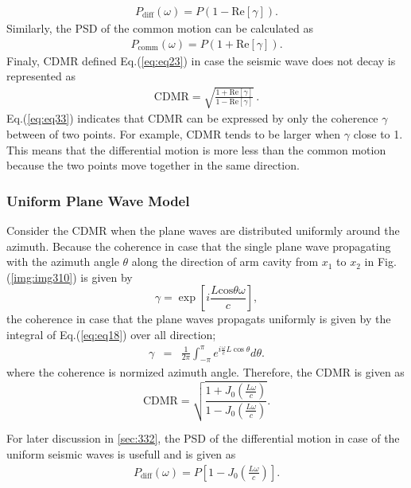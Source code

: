 \begin{eqnarray} \label{eq:eq32}
  P_{\mathrm{diff}}(\omega) = P (1-\mathrm{Re}\left[\gamma\right]).
\end{eqnarray}
Similarly, the PSD of the common motion can be calculated as
\begin{eqnarray}
  P_{\mathrm{comm}}(\omega) = P (1+\mathrm{Re}\left[\gamma\right]).
\end{eqnarray}
Finaly, CDMR defined Eq.(\ref{eq:eq23}) in case the seismic wave does not decay is represented as
\begin{eqnarray}
 \mathrm{CDMR} = \sqrt{\frac{1 + \mathrm{Re} \left[\gamma \right] }{1 - \mathrm{Re} \left[\gamma \right]}}\,. \label{eq:eq33}
\end{eqnarray}
Eq.(\ref{eq:eq33}) indicates that CDMR can be expressed by only the coherence $\gamma$ between of two points. For example, CDMR tends to be larger when $\gamma$ close to 1. This means that the differential motion is more less than the common motion because the two points move together in the same direction.


\subsubsection{Uniform Plane Wave Model}
Consider the CDMR when the plane waves are distributed uniformly around the azimuth. Because the coherence in case that the single plane wave propagating with the azimuth angle $\theta$ along the direction of arm cavity from $x_1$ to $x_2$ in Fig.(\ref{img:img310}) is given by
\begin{equation}
  \gamma = \exp\left[{i\frac{L\mathrm{cos}\theta\omega}{c}}\right], \label{eq:eq18}
\end{equation} 
the coherence in case that the plane waves propagats uniformly is given by the integral of Eq.(\ref{eq:eq18}) over all direction;
\begin{eqnarray} \label{eq:eq19}
  \gamma &=& \frac{1}{2\pi} \int_{-\pi}^{\pi} e^{i\frac{\omega}{c} L\cos \theta} d \theta .
\end{eqnarray}
where the coherence is normized azimuth angle. Therefore, the CDMR is given as
\begin{equation}  \label{eq:eq20}
  \mathrm{CDMR} = \sqrt{\frac{1+J_0(\frac{L\omega}{c})}{1-J_0(\frac{L\omega}{c})}} .
\end{equation}

For later discussion in \cref{sec:332}, the PSD of the differential motion in case of the uniform seismic waves is usefull and is given as
\begin{eqnarray} \label{eq:eq21}
  P_{\mathrm{diff}}(\omega) = P \left[1-J_0\left(\frac{L\omega}{c}\right)\right] .
\end{eqnarray}

